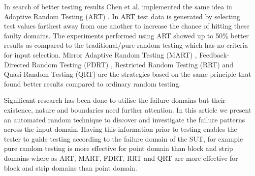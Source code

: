 \documentclass{acm_proc_article-sp}
\begin{document}
In search of better testing results Chen et al. implemented the same idea in Adaptive Random Testing (ART) \cite{Chen2008}. In ART test data is generated by selecting test values farthest away from one another to increase the chance of hitting these faulty domains. The experiments performed using ART showed up to 50\% better results as compared to the traditional/pure random testing which has no criteria for input selection. Mirror Adaptive Random Testing (MART)  \cite{Chen2003}, 
Feedback-Directed Random Testing (FDRT) \cite{Pacheco2007}, 
Restricted Random Testing (RRT) \cite{Chan2002} and Quasi Random Testing  (QRT) \cite{Chen2005} 
are the strategies based on the same principle that found better results compared to ordinary random testing.

Significant research has been done to utilise the failure domains 
but their existence, nature and boundaries need further attention. 
In this article we present an automated random technique to discover 
and investigate the failure patterns across the input domain. 
Having this information prior to testing enables the tester to guide testing according 
to the failure domain of the SUT, for example pure random testing is more effective 
for point domain than block and strip domains where as ART, MART, FDRT, RRT 
and QRT are more effective for block and strip domains than point domain.

\end{document}
